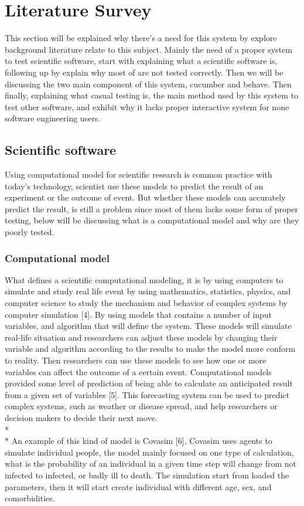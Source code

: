 \chapter{Literature Survey}

This section will be explained why there’s a need for this system by explore background literature relate to this subject. Mainly the need of a proper system to test scientific software, start with explaining what a scientific software is, following up by explain why most of are not tested correctly. Then we will be discussing the two main component of this system, cucumber and behave. Then finally, explaining what casual testing is, the main method used by this system to test other software, and exhibit why it lacks proper interactive system for none software engineering users.

\section{Scientific software}
Using computational model for scientific research is common practice with today’s technology, scientist use these models to predict the result of an experiment or the outcome of event. But whether these models can accurately predict the result, is still a problem since most of them lacks some form of proper testing, below will be discussing what is a computational model and why are they poorly tested.
\subsection{Computational model}
What defines a scientific computational modeling, it is by using computers to simulate and study real life event by using mathematics, statistics, physics, and computer science to study the mechanism and behavior of complex systems by computer simulation [4]. By using models that contains a number of input variables, and algorithm that will define the system. These models will simulate real-life situation and researchers can adjust these models by changing their variable and algorithm according to the results to make the model more conform to reality. Then researchers can use these models to see how one or more variables can affect the outcome of a certain event. Computational models provided some level of prediction of being able to calculate an anticipated result from a given set of variables [5]. This forecasting system can be used to predict complex systems, such as weather or disease spread, and help researchers or decision makers to decide their next move.\\*\\*
An example of this kind of model is Covasim [6], Covasim uses agents to simulate individual people, the model mainly focused on one type of calculation, what is the probability of an individual in a given time step will change from not infected to infected, or badly ill to death. The simulation start from loaded the parameters, then it will start create individual with different age, sex, and comorbidities.
